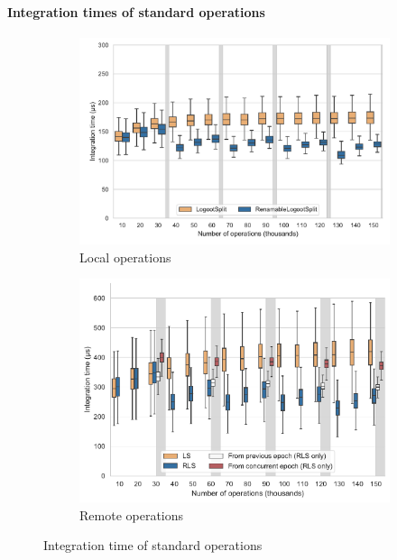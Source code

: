 \documentclass[sigplan,10pt]{acmart}
\begin{document}
\paragraph{Integration times of standard operations}

\begin{figure}[ht!]
    \begin{subfigure}{\columnwidth}
        \centering
        \includegraphics[width=0.9\columnwidth]{img/integration-time-boxplot-local-operations-without-outliers.pdf}
        \caption{Local operations}
        \label{fig:evolution-integration-time-local-insert}
    \end{subfigure}
    \begin{subfigure}{\columnwidth}
        \centering
        \includegraphics[width=0.9\columnwidth]{img/integration-time-boxplot-remote-operations-without-outliers.pdf}
        \caption{Remote operations}
        \label{fig:evolution-integration-time-remote-insert}
    \end{subfigure}
    \caption{Integration time of standard operations}
    \label{fig:evolution-integration-time-insert}
\end{figure}
\end{document}
